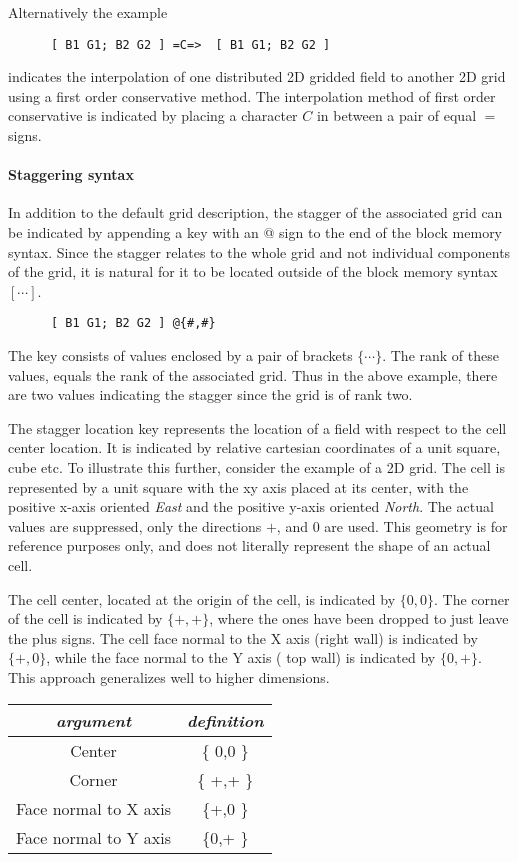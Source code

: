Alternatively the example 
\begin{center}
\begin{verbatim}
      [ B1 G1; B2 G2 ] =C=>  [ B1 G1; B2 G2 ]
\end{verbatim}
\end{center}
indicates the interpolation of one distributed 2D gridded field to another 2D grid using a first order conservative method. The interpolation method of first order conservative is indicated by placing a character $C$ in between a pair of equal $=$ signs. 

\paragraph{Staggering syntax}
In addition to the default grid description, the stagger of the associated grid
can be indicated by appending a key with an @ sign to the end of the block memory syntax. Since the stagger relates to the whole grid and not individual components of the grid, it is natural for it to be located outside of the block memory syntax $[ \cdots ]$.
\begin{center}
\begin{verbatim}
      [ B1 G1; B2 G2 ] @{#,#}
\end{verbatim}
\end{center}
The key consists of values enclosed by a pair of brackets $\{ \cdots \}$. The rank of these values, equals the rank of the associated grid. Thus in the above example, there are two values indicating the stagger since the grid is of rank two. 

The stagger location key represents the location of a field with respect to the cell center location. It is indicated by relative cartesian coordinates of a unit square, cube etc. To illustrate this further, consider the example of a 2D grid. The cell is represented by a unit square with the xy axis placed at its center, with the positive x-axis oriented {\em East} and the positive y-axis oriented {\em North}. The actual values are suppressed, only the directions $+$, and $0$ are used. This geometry is for reference purposes only, and does not literally represent the shape of an actual cell. 

The cell center, located at the origin of the cell, is indicated by $\{ 0,0 \}$. The corner of the cell is indicated by $\{ +,+ \}$, where the ones have been dropped to just leave the plus signs. The cell face normal to the X axis (right wall) is indicated by $\{ +, 0 \}$, while the face normal to the Y axis ( top wall) is indicated by $\{ 0,+ \}$. This approach generalizes well to higher dimensions. 
\begin{center}
\begin{tabular}{| c | c |} \hline 
{\em argument } & {\em definition} \\
\hline \hline
 Center & \{ 0,0 \}  \\
 Corner & \{ +,+ \} \\
 Face normal to X axis & \{+,0 \} \\
 Face normal to Y axis & \{0,+ \} \\
\hline 
\end{tabular}
\end{center}

